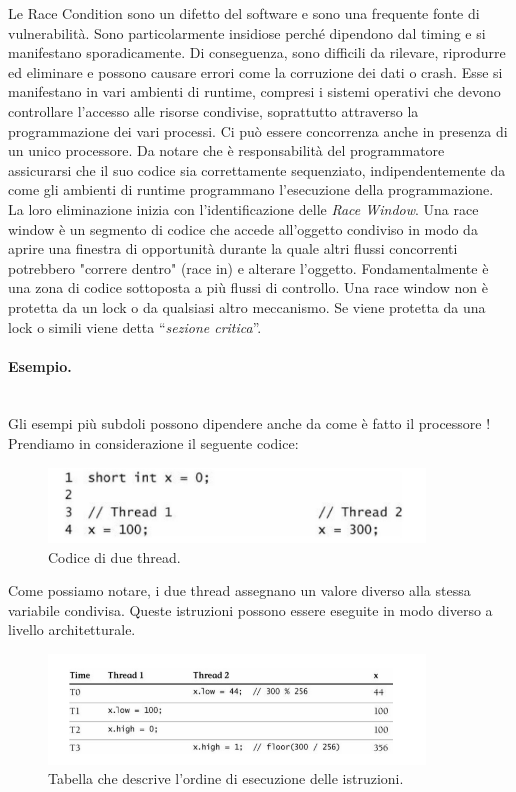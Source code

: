 Le Race Condition sono un difetto del software e sono una frequente fonte di
vulnerabilità.
Sono particolarmente insidiose perché dipendono dal timing e si manifestano
sporadicamente. Di conseguenza, sono difficili da rilevare, riprodurre ed
eliminare e possono
causare errori come la corruzione dei dati o crash.
Esse si manifestano in vari ambienti di runtime, compresi i sistemi operativi
che devono
controllare l'accesso alle risorse condivise, soprattutto attraverso la
programmazione dei vari
processi. Ci può essere concorrenza anche in presenza di un unico processore.
Da notare che è responsabilità del programmatore assicurarsi che il suo codice
sia correttamente
sequenziato, indipendentemente da come gli ambienti di runtime programmano
l'esecuzione
della programmazione.
La loro eliminazione inizia con l'identificazione delle \textit{Race Window}.
Una race window è un
segmento di codice che accede all'oggetto condiviso in modo da aprire una
finestra di opportunità
durante la quale altri flussi concorrenti potrebbero "correre dentro" (race in)
e alterare
l'oggetto. Fondamentalmente è una zona di codice sottoposta a più flussi di
controllo.
Una race window non è protetta da un lock o da qualsiasi altro meccanismo.
Se viene
protetta da una lock o simili viene detta “\textit{sezione critica}”.

\paragraph{Esempio.}\ \\

Gli esempi più subdoli possono dipendere anche da come è fatto il processore !
Prendiamo in considerazione il seguente codice:

\begin{figure}[H]
    \centering
    \includegraphics[width=10cm, keepaspectratio]{capitoli/secure_coding/img/cap_6/esempio1.png}
    \caption{Codice di due thread.}
\end{figure}

Come possiamo notare, i due thread assegnano un valore diverso alla stessa variabile
condivisa. Queste istruzioni
possono essere eseguite in modo diverso a livello architetturale.

\begin{figure}[H]
    \centering
    \includegraphics[width=10cm, keepaspectratio]{capitoli/secure_coding/img/cap_6/esempio1_tab.png}
    \caption{Tabella che descrive l'ordine di esecuzione delle istruzioni.}
\end{figure}

